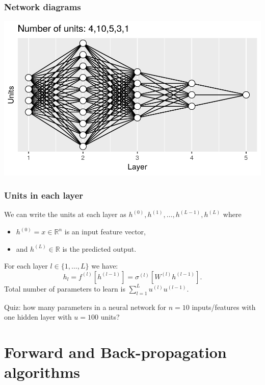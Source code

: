 \documentclass{beamer}
\begin{document}
\begin{frame}
  \frametitle{Network diagrams}

\includegraphics[width=\textwidth]{figure-architecture-fiveLayers}
\end{frame}

\begin{frame}
  \frametitle{Units in each layer}
We can write the units at each layer as
$h^{(0)},h^{(1)},\dots, h^{(L-1)}, h^{(L)}$ where
\begin{itemize}
\item $h^{(0)}=x\in\mathbb R^n$ is an input feature vector,
\item and
$h^{(L)}\in\mathbb R$ is the predicted output.
\end{itemize}
For
each layer $l\in \{1, \dots, L\}$ we have:
\begin{equation}
  \label{eq:h_l}
  h_l = f^{(l)}\left[h^{(l-1)}\right] =
  \sigma^{(l)}\left[ W^{(l)} h^{(l-1)} \right].
\end{equation}
Total number of parameters to learn is
$\sum_{l=1}^L u^{(l)} u^{(l-1)}.$

Quiz: how many parameters in a
neural network for $n=10$ inputs/features with one hidden layer with
$u=100$ units?
\end{frame}



\section{Forward and Back-propagation algorithms}
\end{document}
